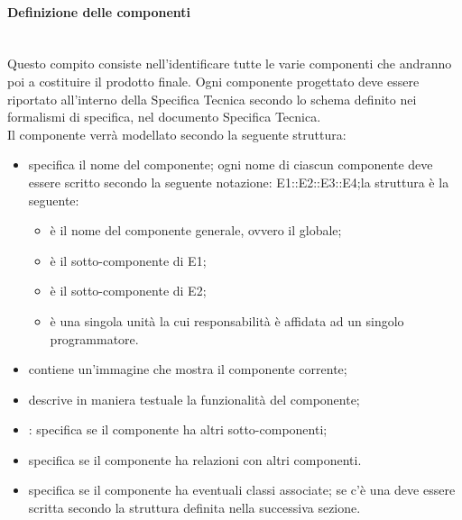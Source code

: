 \paragraph{Definizione delle componenti} \hfill \\
Questo compito consiste nell'identificare tutte le varie componenti che andranno poi a costituire il prodotto finale.
Ogni componente progettato deve essere riportato all'interno della Specifica Tecnica secondo lo schema definito nei formalismi di specifica, nel documento Specifica Tecnica. \\
Il componente verrà modellato secondo la seguente struttura:
\begin{itemize}
\item {}specifica il nome del componente; ogni nome di ciascun componente deve essere scritto secondo la seguente notazione: E1::E2::E3::E4;la struttura è la seguente:
\begin{itemize}
\item {}è il nome del componente generale, ovvero il  globale;
\item {}è il sotto-componente di E1;
\item {}è il sotto-componente di E2;
\item {}è una singola unità la cui responsabilità è affidata ad un singolo programmatore.
\end{itemize}
\item {}contiene un'immagine che mostra il componente corrente;
\item {}descrive in maniera testuale la funzionalità del componente;
\item {}: specifica se il componente ha altri sotto-componenti;
\item {} specifica se il componente ha relazioni con altri componenti.
\item {}specifica se il componente ha eventuali classi associate; se c'è una  deve essere scritta secondo la struttura definita nella successiva sezione.
\end{itemize}

